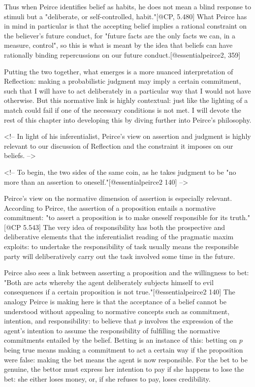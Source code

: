 Thus when Peirce identifies belief as habits, he does not mean a blind
response to stimuli but a "deliberate, or self-controlled,
habit."{[}@CP, 5.480{]} What Peirce has in mind in particular is that
the accepting belief implies a rational constraint on the believer's
future conduct, for "future facts are the only facts we can, in a
measure, control", so this is what is meant by the idea that beliefs can
have rationally binding repercussions on our future
conduct.{[}@essentialpeirce2, 359{]}

Putting the two together, what emerges is a more nuanced interpretation
of Reflection: making a probabilistic judgment may imply a certain
commitment, such that I will have to act deliberately in a particular
way that I would not have otherwise. But this normative link is highly
contextual: just like the lighting of a match could fail if one of the
necessary conditions is not met. I will devote the rest of this chapter
into developing this by diving further into Peirce's philosophy.

\textless{}!-- In light of his inferentialist, Peirce's view on
assertion and judgment is highly relevant to our discussion of
Reflection and the constraint it imposes on our beliefs.
--\textgreater{}

\textless{}!-- To begin, the two sides of the same coin, as he takes
judgment to be "no more than an assertion to
oneself."{[}@essentialpeirce2 140{]} --\textgreater{}

Peirce's view on the normative dimension of assertion is especially
relevant. According to Peirce, the assertion of a proposition entails a
normative commitment: "to assert a proposition is to make oneself
responsible for its truth."{[}@CP 5.543{]} The very idea of
responsibility has both the prospective and deliberative elements that
the inferentialist reading of the pragmatic maxim exploits: to undertake
the responsibility of task usually means the responsible party will
deliberatively carry out the task involved some time in the future.

Peirce also sees a link between asserting a proposition and the
willingness to bet: "Both are acts whereby the agent deliberately
subjects himself to evil consequences if a certain proposition is not
true."{[}@essentialpeirce2 140{]} The analogy Peirce is making here is
that the acceptance of a belief cannot be understood without appealing
to normative concepts such as commitment, intention, and responsibility:
to believe that \(p\) involves the expression of the agent's intention
to assume the responsibility of fulfilling the normative commitments
entailed by the belief. Betting is an instance of this: betting on \(p\)
being true means making a commitment to act a certain way if the
proposition were false: making the bet means the agent is now
responsible. For the bet to be genuine, the bettor must express her
intention to pay if she happens to lose the bet: she either loses money,
or, if she refuses to pay, loses credibility.

